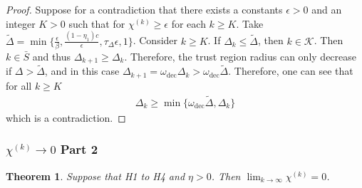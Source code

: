 \documentclass{article}
\newtheorem{theorem}{Theorem}[section]
\theoremstyle{case}
\newcommand{\chik}{{\chi^{(k)}}}
\newcommand{\omegadec}{\omega_{\text{dec}}}
\newcommand{\dk}{\Delta_k}
\newcommand{\oalpha}{\tau_{\Delta}}
\newcommand{\dkpo}{\Delta_{k+1}}
\begin{document}
\begin{proof}
Suppose for a contradiction that there exists a constants $\epsilon > 0$ and an integer $K > 0$ such that for $\chik \ge \epsilon$ for each $k \ge K$.
Take $ \tilde \Delta = \min \{\frac{\epsilon}{\beta}, \frac{(1 - \eta_1)c}{\epsilon}, \oalpha \epsilon, 1\}$.
Consider $k \ge K$.
If $\dk \le \tilde \Delta$, then $k \in \mathcal K$.
Then $k \in \bar S$ and thus $\dkpo \ge \dk$.
Therefore, the trust region radius can only decrease if $\Delta > \tilde \Delta$, and in this case $\dkpo = \omegadec\dk > \omegadec \tilde \Delta$.
Therefore, one can see that for all $k \ge K$
\begin{align}
\dk \ge \min\{\omegadec \tilde \Delta, \dk \}
\end{align}
which is a contradiction.
\end{proof}



\subsubsection{$\chik \to 0$ Part 2}
\begin{theorem}
Suppose that H1 to H4 and $\eta > 0$. Then $\lim_{k\to\infty}\chik=0$.
\end{theorem}
\end{document}

